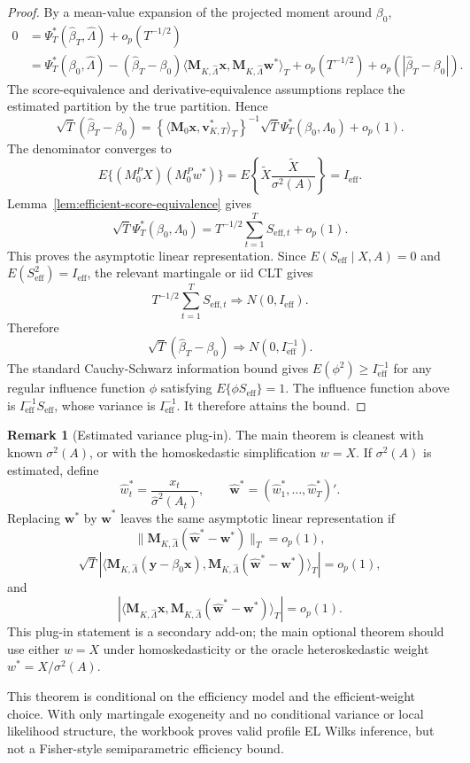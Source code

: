 \documentclass[12pt]{article}
\numberwithin{equation}{section}
\theoremstyle{definition}
\newtheorem{remark}{Remark}
\newcommand{\op}{o_p}
\newcommand{\innerT}[2]{\langle #1,#2\rangle_T}
\begin{document}
\begin{proof}
By a mean-value expansion of the projected moment around \(\beta_0\),
\[
\begin{aligned}
    0
    &=\Psi_T^*(\widehat\beta_T,\widehat\Lambda)+\op(T^{-1/2}) \\
    &=\Psi_T^*(\beta_0,\widehat\Lambda)
      -(\widehat\beta_T-\beta_0)
       \innerT{\bm M_{K,\widehat\Lambda}\bm x}
               {\bm M_{K,\widehat\Lambda}\bm w^*}
      +\op(T^{-1/2})+
       \op(|\widehat\beta_T-\beta_0|).
\end{aligned}
\]
The score-equivalence and derivative-equivalence assumptions replace the
estimated partition by the true partition. Hence
\[
    \sqrt T(\widehat\beta_T-\beta_0)
    =\left\{\innerT{\bm M_0\bm x}{\bm v_{K,T}^*}\right\}^{-1}
      \sqrt T\Psi_T^*(\beta_0,\Lambda_0)+\op(1).
\]
The denominator converges to
\[
    E\{(M_0^PX)(M_0^Pw^*)\}
    =E\left\{\widetilde X\frac{\widetilde X}{\sigma^2(A)}\right\}
    =I_{\mathrm{eff}}.
\]
Lemma~\ref{lem:efficient-score-equivalence} gives
\[
    \sqrt T\Psi_T^*(\beta_0,\Lambda_0)
    =T^{-1/2}\sum_{t=1}^T S_{\mathrm{eff},t}+\op(1).
\]
This proves the asymptotic linear representation. Since
\(E(S_{\mathrm{eff}}\mid X,A)=0\) and
\(E(S_{\mathrm{eff}}^2)=I_{\mathrm{eff}}\), the relevant martingale or iid CLT
gives
\[
    T^{-1/2}\sum_{t=1}^T S_{\mathrm{eff},t}
    \Rightarrow N(0,I_{\mathrm{eff}}).
\]
Therefore
\[
    \sqrt T(\widehat\beta_T-\beta_0)
    \Rightarrow N(0,I_{\mathrm{eff}}^{-1}).
\]
The standard Cauchy-Schwarz information bound gives
\(E(\phi^2)\ge I_{\mathrm{eff}}^{-1}\) for any regular influence function
\(\phi\) satisfying \(E\{\phi S_{\mathrm{eff}}\}=1\). The influence function
above is \(I_{\mathrm{eff}}^{-1}S_{\mathrm{eff}}\), whose variance is
\(I_{\mathrm{eff}}^{-1}\). It therefore attains the bound.
\end{proof}

\begin{remark}[Estimated variance plug-in]
The main theorem is cleanest with known \(\sigma^2(A)\), or with the
homoskedastic simplification \(w=X\). If \(\sigma^2(A)\) is estimated, define
\[
    \widehat w_t^*=\frac{x_t}{\widehat\sigma^2(A_t)},
    \qquad
    \widehat{\bm w}^*=(\widehat w_1^*,\ldots,\widehat w_T^*)'.
\]
Replacing \(\bm w^*\) by \(\widehat{\bm w}^*\) leaves the same asymptotic linear
representation if
\[
    \|\bm M_{K,\widehat\Lambda}(\widehat{\bm w}^*-\bm w^*)\|_T=\op(1),
\]
\[
    \sqrt T\left|\innerT{\bm M_{K,\widehat\Lambda}(\bm y-\beta_0\bm x)}
    {\bm M_{K,\widehat\Lambda}(\widehat{\bm w}^*-\bm w^*)}\right|=\op(1),
\]
and
\[
    \left|\innerT{\bm M_{K,\widehat\Lambda}\bm x}
    {\bm M_{K,\widehat\Lambda}(\widehat{\bm w}^*-\bm w^*)}\right|=\op(1).
\]
This plug-in statement is a secondary add-on; the main optional theorem
should use either \(w=X\) under homoskedasticity or the oracle heteroskedastic
weight \(w^*=X/\sigma^2(A)\).
\end{remark}
This theorem is conditional on the efficiency model and the efficient-weight
choice. With only martingale exogeneity and no conditional variance or local
likelihood structure, the workbook proves valid profile EL Wilks inference, but
not a Fisher-style semiparametric efficiency bound.
\end{document}

